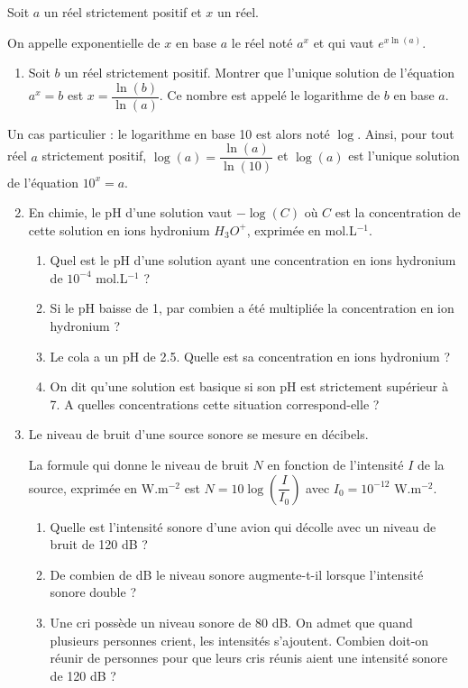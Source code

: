 \documentclass[11pt,fleqn, openany]{book} %
\begin{document}
\begin{exercise}[topic=log02, subtitle={(Logarithme décimal et applications)}] Soit $a$ un réel strictement positif et $x$ un réel. 

On appelle exponentielle de $x$ en base $a$ le réel noté $a^x$ et qui vaut $e^{x \ln(a)}$.
\begin{enumerate}
\item Soit $b$ un réel strictement positif. Montrer que l'unique solution de l'équation $a^x=b$ est $x=\dfrac{\ln(b)}{\ln(a)}$. Ce nombre est appelé le logarithme de $b$ en base $a$.\end{enumerate}
Un cas particulier : le logarithme en base 10 est alors noté $\log$. Ainsi, pour tout réel $a$ strictement positif, $\log(a)=\dfrac{\ln(a)}{\ln(10)}$ et $\log(a)$ est l'unique solution de l'équation $10^x=a$.

\begin{enumerate}
\setcounter{enumi}{1}
\item En chimie, le pH d'une solution vaut $-\log(C)$ où $C$ est la concentration de cette solution en ions hydronium $H_3O^+$, exprimée en mol.L$^{-1}$.
\begin{enumerate}
\item Quel est le pH d'une solution ayant une concentration en ions hydronium de $10^{-4}$ mol.L$^{-1}$ ?
\item Si le pH baisse de 1, par combien a été multipliée la concentration en ion hydronium ?
\item Le cola a un pH de 2.5. Quelle est sa concentration en ions hydronium ?
\item On dit qu'une solution est basique si son pH est strictement supérieur à 7. A quelles concentrations cette situation correspond-elle ?
\end{enumerate}
\item Le niveau de bruit d'une source sonore se mesure en décibels. 

La formule qui donne le niveau de bruit $N$ en fonction de l'intensité $I$ de la source, exprimée en W.m$^{-2}$ est $N=10\log\left(\dfrac{I}{I_0}\right)$ avec $I_0=10^{-12}$ W.m$^{-2}$.
\begin{enumerate}
\item Quelle est l'intensité sonore d'une avion qui décolle avec un niveau de bruit de 120 dB ?
\item De combien de dB le niveau sonore augmente-t-il lorsque l'intensité sonore double ?
\item Une cri possède un niveau sonore de 80 dB. On admet que quand plusieurs personnes crient, les intensités s'ajoutent. Combien doit-on réunir de personnes pour que leurs cris réunis aient une intensité sonore de 120 dB ?
\end{enumerate}
\end{enumerate}

\end{exercise}
\end{document}
